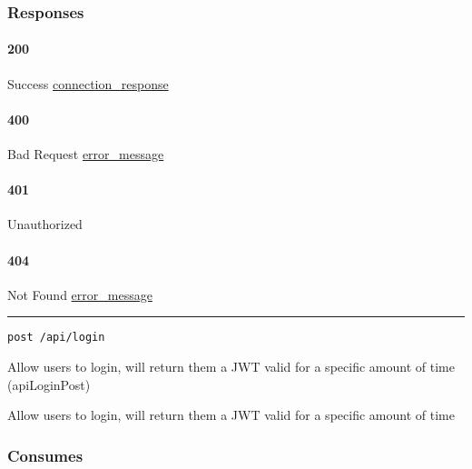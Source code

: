 \hypertarget{responses-6}{%
\subsubsection{Responses}\label{responses-6}}

\hypertarget{section-19}{%
\paragraph{200}\label{section-19}}

Success \protect\hyperlink{connection_response}{connection\_response}

\hypertarget{section-20}{%
\paragraph{400}\label{section-20}}

Bad Request \protect\hyperlink{error_message}{error\_message}

\hypertarget{section-21}{%
\paragraph{401}\label{section-21}}

Unauthorized \protect\hyperlink{}{}

\hypertarget{section-22}{%
\paragraph{404}\label{section-22}}

Not Found \protect\hyperlink{error_message}{error\_message}

\begin{center}\rule{0.5\linewidth}{\linethickness}\end{center}

\protect\hypertarget{apiLoginPost}{}{}

\begin{verbatim}
post /api/login
\end{verbatim}

Allow users to login, will return them a JWT valid for a specific amount
of time ({apiLoginPost})

Allow users to login, will return them a JWT valid for a specific amount
of time

\hypertarget{consumes-2}{%
\subsubsection{Consumes}\label{consumes-2}}


